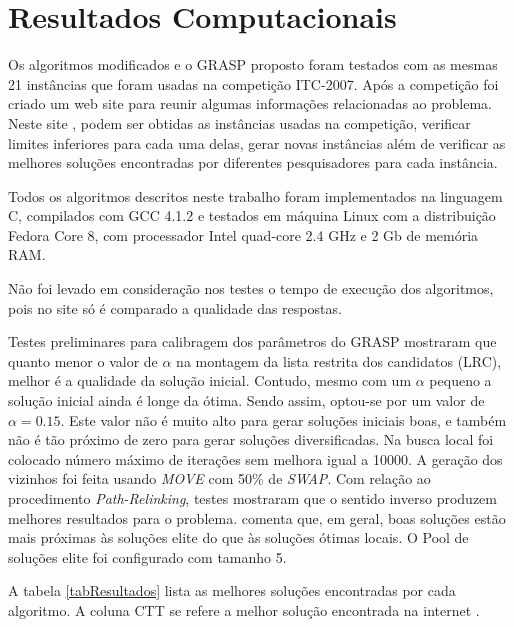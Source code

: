 \documentclass[11pt]{article}
\begin{document}
\section{Resultados Computacionais}
\label{sec:resultados}

Os algoritmos modificados e o GRASP proposto foram testados com as mesmas 21 instâncias que foram usadas na competição ITC-2007. Após a competição foi criado um web site para reunir algumas informações relacionadas ao problema. Neste site \cite{ctt}, podem ser obtidas as instâncias usadas na competição, verificar limites inferiores para cada uma delas, gerar novas instâncias além de verificar as melhores soluções encontradas por diferentes pesquisadores para cada instância.

Todos os algoritmos descritos neste trabalho foram implementados na linguagem C, compilados com GCC 4.1.2 e testados em máquina Linux com a distribuição Fedora Core 8, com processador Intel quad-core 2.4 GHz e 2 Gb de memória RAM.

Não foi levado em consideração nos testes o tempo de execução dos algoritmos, pois no site \cite{ctt} só é comparado a qualidade das respostas.

Testes preliminares para calibragem dos parâmetros do GRASP mostraram que quanto menor o valor de $\alpha$ na montagem da lista restrita dos candidatos (LRC), melhor é a qualidade da solução inicial. Contudo, mesmo com um $\alpha$ pequeno a solução inicial ainda é longe da ótima. Sendo assim, optou-se por um valor de $\alpha = 0.15$. Este valor não é muito alto para gerar soluções iniciais boas, e também não é tão próximo de zero para gerar soluções diversificadas. Na busca local foi colocado número máximo de iterações sem melhora igual a 10000. A geração dos vizinhos foi feita usando \textit{MOVE} com 50\% de \textit{SWAP}. Com relação ao procedimento \textit{Path-Relinking}, testes mostraram que o sentido inverso produzem melhores resultados para o problema. \cite{grasp_resende_ribeiro} comenta que, em geral, boas soluções estão mais próximas às soluções elite do que às soluções ótimas locais. O Pool de soluções elite foi configurado com tamanho 5.

A tabela \ref{tabResultados} lista as melhores soluções encontradas por cada algoritmo. A coluna CTT se refere a melhor solução encontrada na internet \cite{ctt}.



\end{document}
